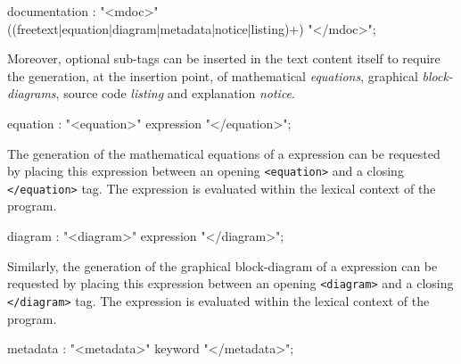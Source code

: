 \begin{rail}
documentation : "<mdoc>" ((freetext|equation|diagram|metadata|notice|listing)+) "</mdoc>";
\end{rail}

Moreover, optional sub-tags can be inserted in the text content itself to require the generation, at the insertion point, of mathematical \textit{equations}, graphical \textit{block-diagrams}, \faust source code \textit{listing} and explanation \textit{notice}.


\begin{rail}
equation : "<equation>" expression "</equation>";
\end{rail}

The generation of the mathematical equations of a \faust expression can be requested by placing this expression between an opening \lstinline'<equation>' and a closing \lstinline'</equation>' tag. The expression is evaluated within the lexical context of the \faust program.


\begin{rail}
diagram : "<diagram>" expression "</diagram>";
\end{rail}

Similarly, the generation of the graphical block-diagram of a \faust expression can be requested by placing this expression between an opening \lstinline'<diagram>' and a closing \lstinline'</diagram>' tag. The expression is evaluated within the lexical context of the \faust program.


\begin{rail}
metadata : "<metadata>" keyword "</metadata>";
\end{rail}

